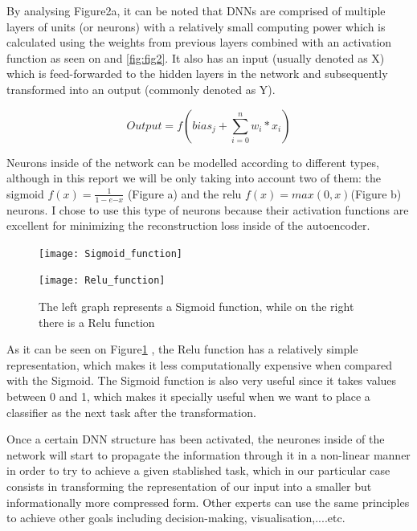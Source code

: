 By analysing Figure2a, it can be noted that DNNs are comprised of multiple layers of units (or neurons) with a relatively small computing power which is calculated using the weights from previous layers combined with an activation function as seen on and \ref{fig:fig2}. It also has an input (usually denoted as X) which is feed-forwarded to the hidden layers in the network and subsequently transformed into an output (commonly denoted as Y). 

\begin{equation}\label{eq:artificial neuron}
Output = f( bias_j + \sum_{i = 0}^{n} w_{i}*x_i ) 
\end{equation}


Neurons inside of the network can be modelled according to different types, although in this report we will be only taking into account two of them: the sigmoid $f(x) = \frac{1}{1 - e{-x}}$ (Figure a) and the relu $f(x) = max(0,x)$(Figure b) neurons. I chose to use this type of neurons because their activation functions are excellent for minimizing the reconstruction loss inside of the autoencoder. \newline

\begin{figure}[H]
	\begin{minipage}{.5\textwidth}
		\texttt{[image: Sigmoid\_function]}
	\end{minipage}%
	\begin{minipage}{.5\textwidth}
		\begin{flushright}
			\texttt{[image: Relu\_function]}  
		\end{flushright} 
	\end{minipage}  
	\caption{The left graph represents a Sigmoid function, while on the right there is a Relu function}
	\label{fig:fig3}
\end{figure}

As it can be seen on Figure\ref{fig:fig3} , the Relu function has a relatively simple representation, which makes it less computationally expensive when compared with the Sigmoid. The Sigmoid function is also very useful since it takes values between 0 and 1, which makes it specially useful when we want to place a classifier as the next task after the transformation.\par 

Once a certain DNN structure has been activated, the neurones inside of the network will start to propagate the information through it in a non-linear manner in order to try to achieve a given stablished task, which in our particular case consists in transforming the representation of our input into a smaller but informationally more compressed form. Other experts can use the same principles to achieve other goals including decision-making, visualisation,....etc.\par

